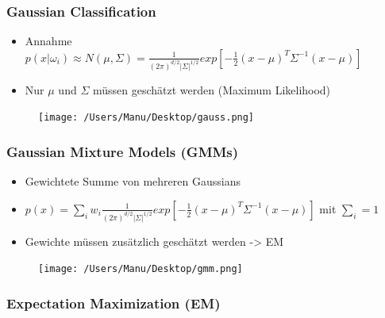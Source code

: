\documentclass[paper=a4, fontsize=11pt]{scrartcl} %
\numberwithin{equation}{section} %
\numberwithin{figure}{section} %
\numberwithin{table}{section} %
\begin{document}
\subsubsection{Gaussian Classification}

\begin{minipage}{0.55\textwidth}
\begin{itemize}
\item Annahme $p(x|\omega_i) \approx N(\mu,\Sigma) = \frac{1}{(2\pi)^{d/2} |\Sigma|^{1/2}} exp[-\frac{1}{2}(x-\mu)^T \Sigma^{-1}(x-\mu)]$
\item Nur $\mu$ und $\Sigma$ müssen geschätzt werden (Maximum Likelihood)
\end{itemize}
\end{minipage} \hfill
\begin{minipage}{0.4\textwidth}
\begin{figure}[H]
\texttt{[image: /Users/Manu/Desktop/gauss.png]}
\end{figure}
\end{minipage}

\subsubsection{Gaussian Mixture Models (GMMs)}

\begin{minipage}{0.55\textwidth}
\begin{itemize}
\item Gewichtete Summe von mehreren Gaussians
\item $p(x) = \sum\limits_i w_i \frac{1}{(2\pi)^{d/2} |\Sigma|^{1/2}} exp[-\frac{1}{2}(x-\mu)^T \Sigma^{-1}(x-\mu)]$ mit $\sum\limits_i = 1$
\item Gewichte müssen zusätzlich geschätzt werden -> EM
\end{itemize}
\end{minipage} \hfill
\begin{minipage}{0.4\textwidth}
\begin{figure}[H]
\texttt{[image: /Users/Manu/Desktop/gmm.png]}
\end{figure}
\end{minipage}
\newpage
\subsubsection{Expectation Maximization (EM)}
\end{document}
